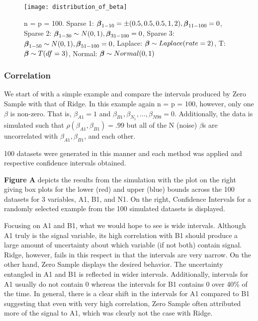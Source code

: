 
\begin{figure}
  \texttt{[image: distribution\_of\_beta]}
  \caption{\label{Fig:distribution_of_beta} n = p = 100. Sparse 1: $\boldsymbol{\beta}_{1-10} = \pm(0.5, 0.5, 0.5, 1, 2), \boldsymbol{\beta}_{11-100} = 0$, Sparse 2: $\boldsymbol{\beta}_{1-30} \sim N(0, 1), \boldsymbol{\beta}_{31-100} = 0$, Sparse 3: $\boldsymbol{\beta}_{1-50} \sim N(0, 1), \boldsymbol{\beta}_{51-100} = 0$, Laplace: $\boldsymbol{\beta} \sim Laplace(rate = 2)$, T: $\boldsymbol{\beta} \sim T(df = 3)$, Normal: $\boldsymbol{\beta} \sim Normal(0, 1)$}
\end{figure}

\subsubsection{Correlation}

We start of with a simple example and compare the intervals produced by Zero Sample with that of Ridge. In this example again n = p = 100, however, only one $\beta$ is non-zero. That is, $\beta_{A1} = 1$ and $\beta_{B1}, \beta_{N_1}, \ldots, \beta_{N98} = 0$. Additionally, the data is simulated such that $\rho(\beta_{A1}, \beta_{B1}) = .99$ but all of the N (noise) $\beta$s are uncorrelated with $\beta_{A1}, \beta_{B1}$, and each other.

100 datasets were generated in this manner and each method was applied and respective confidence intervals obtained.

\textbf{Figure A} depicts the results from the simulation with the plot on the right giving box plots for the lower (red) and upper (blue) bounds across the 100 datasets for 3 variables, A1, B1, and N1. On the right, Confidence Intervals for a randomly selected example from the 100 simulated datasets is displayed.

Focusing on A1 and B1, what we would hope to see is wide intervals. Although A1 truly is the signal variable, its high correlation with B1 should produce a large amount of uncertainty about which variable (if not both) contain signal. Ridge, however, fails in this respect in that the intervals are very narrow. On the other hand, Zero Sample displays the desired behavior. The uncertainty entangled in A1 and B1 is reflected in wider intervals. Additionally, intervals for A1 usually do not contain 0 whereas the intervals for B1 contains 0 over 40\% of the time. In general, there is a clear shift in the intervals for A1 compared to B1 suggesting that even with very high correlation, Zero Sample often attributed more of the signal to A1, which was clearly not the case with Ridge.


